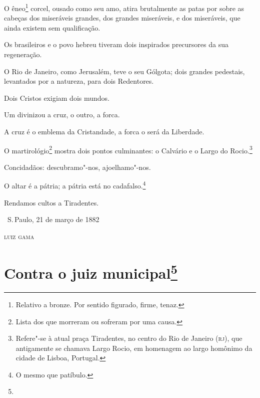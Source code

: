 
O êneo\footnote{Relativo a bronze. Por sentido figurado, firme, tenaz.}
corcel, ousado como seu amo, atira brutalmente as patas por sobre as
cabeças dos miseráveis grandes, dos grandes miseráveis, e dos
miseráveis, que ainda existem sem qualificação.

Os brasileiros e o povo hebreu tiveram dois inspirados precursores da
sua regeneração.

O Rio de Janeiro, como Jerusalém, teve o seu Gólgota; dois grandes
pedestais, levantados por a natureza, para dois Redentores.

Dois Cristos exigiam dois mundos.

Um divinizou a cruz, o outro, a forca.

A cruz é o emblema da Cristandade, a forca o será da Liberdade.

O martirológio\footnote{Lista dos que morreram ou sofreram por uma
  causa.} mostra dois pontos culminantes: o Calvário e o Largo do
Rocio.\footnote{Refere"-se à atual praça Tiradentes, no centro do Rio
  de Janeiro (\textsc{rj}), que antigamente se chamava Largo Rocio, em
  homenagem ao largo homônimo da cidade de Lisboa, Portugal.}

Concidadãos: descubramo"-nos, ajoelhamo"-nos.

O altar é a pátria; a pátria está no cadafalso.\footnote{O mesmo que
  patíbulo.}

Rendamos cultos a Tiradentes.

\bigskip

\hfill\ S.\,Paulo, 21 de março de 1882\smallskip

\hfill\textsc{luiz gama}

\chapter{Contra o juiz municipal\footnote[*]{}}

